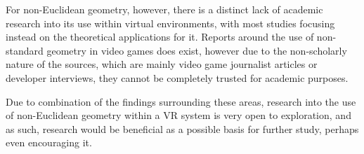 		For non-Euclidean geometry, however, there is a distinct lack of academic research into its use within virtual environments, with most studies focusing instead on the theoretical applications for it.
		Reports around the use of non-standard geometry in video games does exist, however due to the non-scholarly nature of the sources, which are mainly video game journalist articles or developer interviews, they cannot be completely trusted for academic purposes.

		Due to combination of the findings surrounding these areas, research into the use of non-Euclidean geometry within a VR system is very open to exploration, and as such, research would be beneficial as a possible basis for further study, perhaps even encouraging it.
